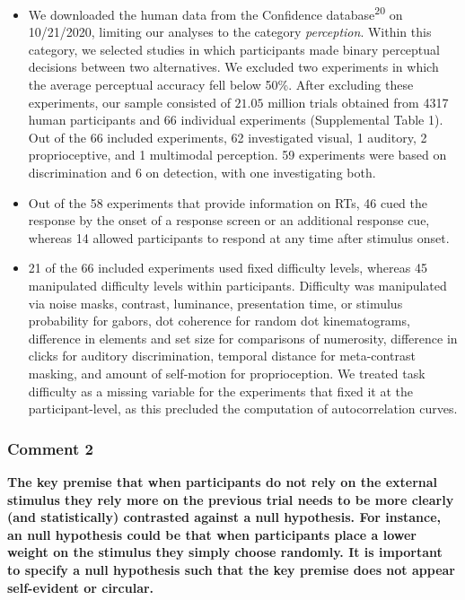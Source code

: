 \documentclass[
]{article}
\begin{document}
\begin{itemize}
\item
  We downloaded the human data from the Confidence
  database\textsuperscript{20} on 10/21/2020, limiting our analyses to
  the category \emph{perception}. Within this category, we selected
  studies in which participants made binary perceptual decisions between
  two alternatives. We excluded two experiments in which the average
  perceptual accuracy fell below 50\%. After excluding these
  experiments, our sample consisted of \(21.05\) million trials obtained
  from 4317 human participants and 66 individual experiments
  (Supplemental Table 1). Out of the 66 included experiments, 62
  investigated visual, 1 auditory, 2 proprioceptive, and 1 multimodal
  perception. 59 experiments were based on discrimination and 6 on
  detection, with one investigating both.
\item
  Out of the 58 experiments that provide information on RTs, 46 cued the
  response by the onset of a response screen or an additional response
  cue, whereas 14 allowed participants to respond at any time after
  stimulus onset.
\item
  21 of the 66 included experiments used fixed difficulty levels,
  whereas 45 manipulated difficulty levels within participants.
  Difficulty was manipulated via noise masks, contrast, luminance,
  presentation time, or stimulus probability for gabors, dot coherence
  for random dot kinematograms, difference in elements and set size for
  comparisons of numerosity, difference in clicks for auditory
  discrimination, temporal distance for meta-contrast masking, and
  amount of self-motion for proprioception. We treated task difficulty
  as a missing variable for the experiments that fixed it at the
  participant-level, as this precluded the computation of
  autocorrelation curves.
\end{itemize}

\hypertarget{comment-2-1}{%
\subsubsection{Comment 2}\label{comment-2-1}}

\textbf{The key premise that when participants do not rely on the
external stimulus they rely more on the previous trial needs to be more
clearly (and statistically) contrasted against a null hypothesis. For
instance, an null hypothesis could be that when participants place a
lower weight on the stimulus they simply choose randomly. It is
important to specify a null hypothesis such that the key premise does
not appear self-evident or circular.}
\end{document}
